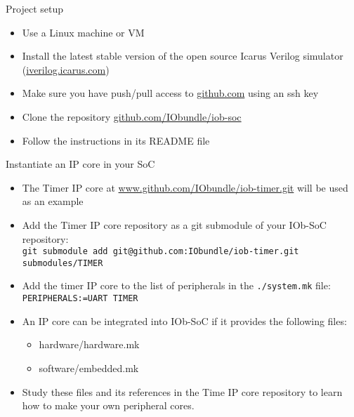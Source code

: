 \documentclass [xcolor=svgnames, t] {beamer}
\begin{document}
\begin{frame}{Project setup}
\begin{center}
  \begin{itemize}
    \item Use a Linux machine or VM
    \item Install the latest stable version of the open source Icarus Verilog simulator (\url{iverilog.icarus.com})
    \item Make sure you have push/pull access to \url{github.com} using an ssh
      key
    \item Clone the repository \url{github.com/IObundle/iob-soc}
    \item Follow the instructions in its README file
  \end{itemize}
\end{center}
\end{frame}


\begin{frame}{Instantiate an IP core in your SoC}
  \begin{itemize}
  \item The Timer IP core at \url{www.github.com/IObundle/iob-timer.git} will be used as an example
  \item Add the Timer IP core repository as a git submodule of your IOb-SoC repository:\\
    {\tt git submodule add git@github.com:IObundle/iob-timer.git submodules/TIMER}
  \item Add the timer IP core to the list of peripherals in the {\tt ./system.mk} file:\\
    {\tt PERIPHERALS:=UART TIMER}
  \item An IP core can be integrated into IOb-SoC if it provides the following files: 
    \begin{itemize}
    \item hardware/hardware.mk
    \item software/embedded.mk
    \end{itemize}
  \item Study these files and its references in the Time IP core repository to learn how to make your own peripheral cores.
  \end{itemize}
\end{frame}
\end{document}

